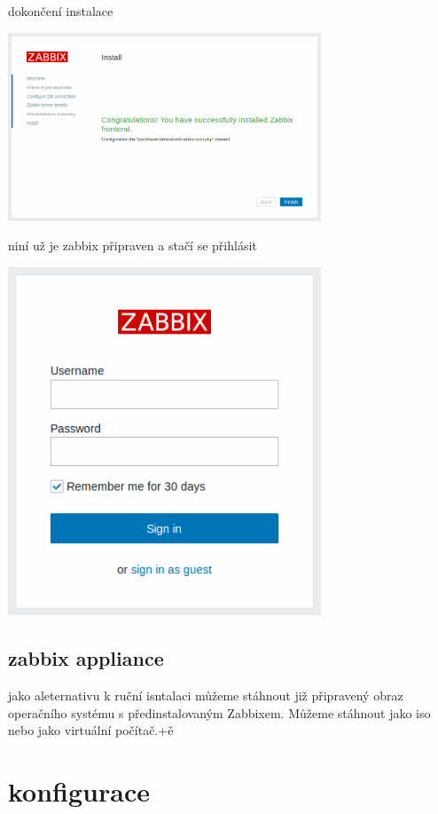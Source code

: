 \documentclass{article}
\begin{document}
dokončení instalace
\begin{center}
  \includegraphics[width=0.7\textwidth]{obrazky/install_7.png}
\end{center}
niní už je zabbix připraven a stačí se přihlásit
\begin{center}
  \includegraphics[width=0.7\textwidth]{obrazky/login.png}
\end{center}
\subsection{zabbix appliance}
jako aleternativu k ruční isntalaci můžeme stáhnout již připravený obraz operačního systému s předinstalovaným Zabbixem. Můžeme stáhnout jako iso nebo jako virtuální počítač.+ě 
\section{konfigurace}
\end{document}
